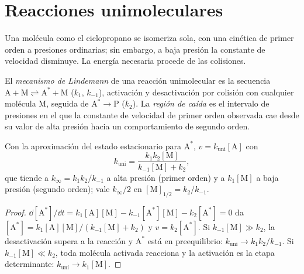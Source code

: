 \section{Reacciones unimoleculares}

Una molécula como el ciclopropano se isomeriza sola, con una cinética de primer orden a
presiones ordinarias; sin embargo, a baja presión la constante de velocidad disminuye. La energía
necesaria procede de las colisiones.

\begin{definition}\label{def:b3:complex-kinetics:lindemann}
El \emph{mecanismo de Lindemann} de una reacción
unimolecular es la secuencia $\mathrm{A + M \rightleftharpoons A^* + M}$ ($k_1$, $k_{-1}$), activación y
desactivación por colisión con cualquier molécula M, seguida de $\mathrm{A^* \to P}$ ($k_2$). La
\emph{región de caída} es el intervalo de presiones en el que la
constante de velocidad de primer orden observada cae desde su valor de alta presión hacia un
comportamiento de segundo orden.
\end{definition}

\begin{theorem}\label{thm:b3:complex-kinetics:lindemann}
Con la aproximación del estado estacionario para $\mathrm{A^*}$, $v = k_{\mathrm{uni}}[\mathrm A]$ con
\[
  k_{\mathrm{uni}} = \frac{k_1k_2[\mathrm M]}{k_{-1}[\mathrm M] + k_2},
\]
que tiende a $k_\infty = k_1k_2/k_{-1}$ a alta presión (primer orden) y a $k_1[\mathrm M]$ a
baja presión (segundo orden); vale $k_\infty/2$ en $[\mathrm M]_{1/2} = k_2/k_{-1}$.
\end{theorem}

\begin{proof}
$\dd[\mathrm{A^*}]/\dd t = k_1[\mathrm A][\mathrm M] - k_{-1}[\mathrm{A^*}][\mathrm M] - k_2[\mathrm{A^*}] = 0$ da $[\mathrm{A^*}] =
k_1[\mathrm A][\mathrm M]/(k_{-1}[\mathrm M] + k_2)$ y $v = k_2[\mathrm{A^*}]$. Si $k_{-1}[\mathrm M] \gg k_2$, la desactivación
supera a la reacción y $\mathrm{A^*}$ está en preequilibrio: $k_{\mathrm{uni}} \to k_1k_2/k_{-1}$. Si $k_{-1}[\mathrm M]
\ll k_2$, toda molécula activada reacciona y la activación es la etapa determinante:
$k_{\mathrm{uni}} \to k_1[\mathrm M]$.
\end{proof}

